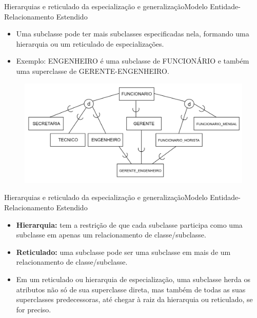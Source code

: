 \documentclass[t]{beamer}
\begin{document}

\begin{ftst}{Hierarquias e reticulado da especialização e generalização}{Modelo Entidade-Relacionamento Estendido}

\begin{itemize}
    \item Uma subclasse pode ter mais subclasses especificadas nela, formando uma hierarquia ou um reticulado de especializações. 
    \item Exemplo: ENGENHEIRO é uma subclasse de FUNCIONÁRIO e também uma superclasse de GERENTE-ENGENHEIRO.
\end{itemize}
\begin{figure}
    \centering
    \includegraphics[scale=0.13]{Figuras/02_03.png}
\end{figure}
\end{ftst}


\begin{ftst}{Hierarquias e reticulado da especialização e generalização}{Modelo Entidade-Relacionamento Estendido}

\begin{itemize}
    \item \textbf{Hierarquia:} tem a restrição de que cada subclasse participa como uma subclasse em apenas um relacionamento de classe/subclasse.
    \item \textbf{Reticulado:} uma subclasse pode ser uma subclasse em mais de um relacionamento de classe/subclasse.
    \item Em um reticulado ou hierarquia de especialização, uma subclasse herda os atributos não só de sua superclasse direta, mas também de todas as suas superclasses predecessoras, até chegar à raiz da hierarquia ou reticulado, se for preciso.
\end{itemize}
\end{ftst}
\end{document}
